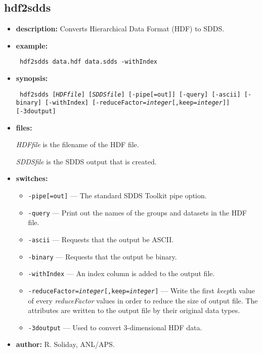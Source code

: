 %
\newpage
\subsection{hdf2sdds}
\label{hdf2sdds}

\begin{itemize}
\item {\bf description:} Converts Hierarchical Data Format (HDF) to SDDS.
\item {\bf example:} 
\begin{flushleft}{\tt
hdf2sdds data.hdf data.sdds -withIndex
}\end{flushleft}
\item {\bf synopsis:}
\begin{flushleft}{\tt
hdf2sdds [{\em HDFfile}] [{\em SDDSfile}] [-pipe[=out]]
[-query] [-ascii] [-binary] [-withIndex] [-reduceFactor={\em integer}[,keep={\em integer}]] [-3doutput]
}\end{flushleft}
\item {\bf files: }

{\em HDFfile} is the filename of the HDF file.

{\em SDDSfile} is the SDDS output that is created.

\item {\bf switches:}
\begin{itemize}
    \item {\tt -pipe[=out]} --- The standard SDDS Toolkit pipe option.
    \item {\tt -query} --- Print out the names of the groups and datasets in the HDF file.
    \item {\tt -ascii} --- Requests that the output be ASCII.
    \item {\tt -binary} --- Requests that the output be binary.
    \item {\tt -withIndex} --- An index column is added to the output file.
    \item {\tt -reduceFactor={\em integer}[,keep={\em integer}]} --- Write the first {\em keep}th value of every {\em reduceFactor} values in order to reduce the size of output file. The attributes are written to the output file by their original data types.
    \item {\tt -3doutput} --- Used to convert 3-dimensional HDF data.
\end{itemize}
\item {\bf author:} R. Soliday, ANL/APS.
\end{itemize}
